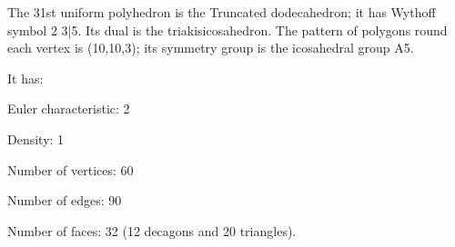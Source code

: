 The 31st uniform polyhedron is the Truncated dodecahedron; it has Wythoff symbol 2 3|5. Its dual is the triakisicosahedron. The pattern of polygons round each vertex is (10,10,3); its symmetry group is the icosahedral group A5.\par
It has:\par
Euler characteristic: 2\par
Density: 1\par
Number of vertices: 60\par
Number of edges:  90\par
Number of faces: 32 (12 decagons and 20 triangles).
  